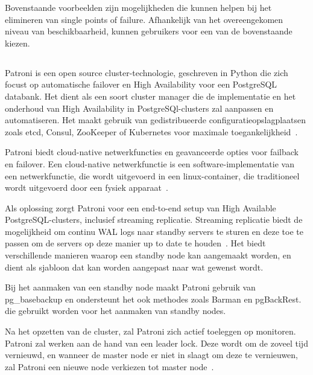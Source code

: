 Bovenstaande voorbeelden zijn mogelijkheden die kunnen helpen bij het elimineren van single points of failure. Afhankelijk van het overeengekomen niveau van beschikbaarheid, kunnen gebruikers voor een van de bovenstaande kiezen.




\subsection{}
\label{subsec:Patroni}


Patroni is een open source cluster-technologie, geschreven in Python die zich focust op automatische failover en High Availability voor een PostgreSQL databank. Het dient als een soort cluster manager die de implementatie en het onderhoud van High Availability in PostgreSQl-clusters zal aanpassen en automatiseren. Het maakt gebruik van gedistribueerde configuratieopslagplaatsen zoals etcd, Consul, ZooKeeper of Kubernetes voor maximale toegankelijkheid~\autocite{Markwort2018}.


Patroni biedt cloud-native netwerkfuncties en geavanceerde opties voor failback en failover. Een cloud-native netwerkfunctie is een software-implementatie van een netwerkfunctie, die wordt uitgevoerd in een linux-container, die traditioneel wordt uitgevoerd door een fysiek apparaat~\autocite{CDNF2020}.

Als oplossing zorgt Patroni voor een end-to-end setup van High Available PostgreSQL-clusters, inclusief streaming replicatie. Streaming replicatie biedt de mogelijkheid om continu WAL logs naar standby servers te sturen en deze toe te passen om de servers op deze manier up to date te houden~\autocite{2020}. %
Het biedt verschillende manieren waarop een standby node kan aangemaakt worden, en dient als sjabloon dat kan worden aangepast naar wat gewenst wordt.

Bij het aanmaken van een standby node maakt Patroni gebruik van pg\_basebackup en ondersteunt het ook methodes zoals Barman en pgBackRest. die gebruikt worden voor het aanmaken van standby nodes.

Na het opzetten van de cluster, zal Patroni zich actief toeleggen op monitoren. Patroni zal werken aan de hand van een leader lock. Deze wordt om de zoveel tijd vernieuwd, en wanneer de master node er niet in slaagt om deze te vernieuwen, zal Patroni een nieuwe node verkiezen tot master node~\autocite{ScaleGrid2018}. %


